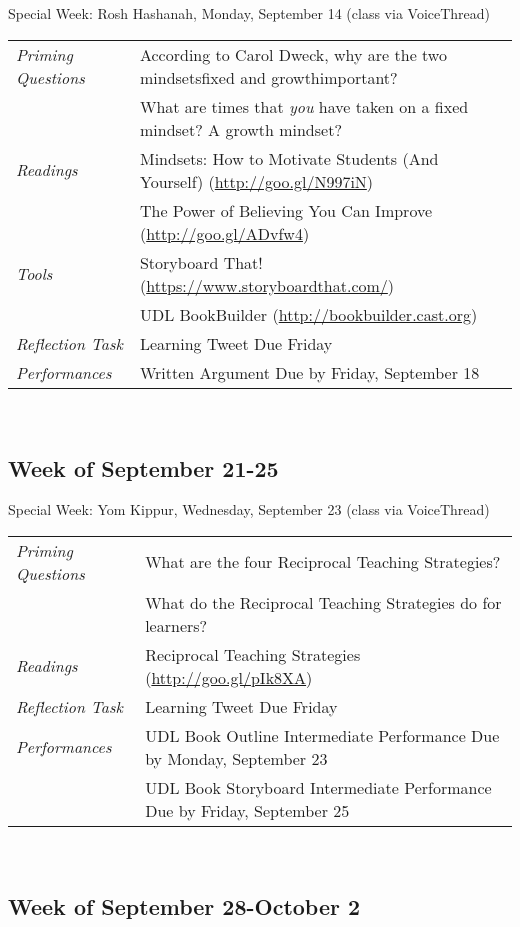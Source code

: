 \documentclass{tufte-handout}
\newcommand{\tabpq}{\faQuestionCircle\medspace\textit{Priming Questions}}
\newcommand{\tabread}{\faBook\medspace\textit{Readings}}
\newcommand{\tabperformance}{\faTasks\medspace\textit{Performances}}
\newcommand{\tabtools}{\faWrench\medspace\textit{Tools}}
\newcommand{\tabtweet}{\faLightbulbO\medspace\textit{Reflection Task} & Learning Tweet Due Friday \\}
\newenvironment{tabsched}
	{\small
	\begin{tabular}{p{1.5in}p{4.5in}}
	\toprule}
	{\bottomrule
	\end{tabular}
	\normalsize\\}
\newenvironment{specweek}
	{\begin{center}
		\fontseries{b} \faBullhorn \medspace Special Week: }
		{\medspace \faBullhorn \fontseries{m}
	\end{center}}
\newcommand{\weeksix}{September 21-25}
\newcommand{\weekseven}{September 28-October 2}
\newcommand{\roshhashanah}{Rosh Hashanah, Monday, September 14 (class via VoiceThread)}
\newcommand{\yomkippur}{Yom Kippur, Wednesday, September 23 (class via VoiceThread)}
\begin{document}
\begin{fullwidth}
\begin{specweek}\roshhashanah\end{specweek}

\begin{tabsched}
	\tabpq & According to Carol Dweck, why are the two mindsets\textemdash{}fixed and growth\textemdash{}important? \\
	& What are times that \emph{you} have taken on a fixed mindset? A growth mindset? \\
	\midrule
	\tabread & Mindsets: How to Motivate Students (And Yourself) (\url{http://goo.gl/N997iN}) \\
	& The Power of Believing You Can Improve (\url{http://goo.gl/ADvfw4}) \\
	\midrule
	\tabtools & Storyboard That! (\url{https://www.storyboardthat.com/}) \\
	& UDL BookBuilder (\url{http://bookbuilder.cast.org}) \\
	\midrule
	\tabtweet
	\midrule
	\tabperformance & Written Argument Due by Friday, September 18 \\
\end{tabsched}

\subsection{Week of \weeksix}

\begin{specweek}\yomkippur\end{specweek}

\begin{tabsched}
	\tabpq & What are the four Reciprocal Teaching Strategies? \\
	& What do the Reciprocal Teaching Strategies do for learners? \\
	\midrule
	\tabread & Reciprocal Teaching Strategies (\url{http://goo.gl/pIk8XA}) \\
	\midrule
	\tabtweet
	\midrule
	\tabperformance & UDL Book Outline Intermediate Performance Due by Monday, September 23 \\
	& UDL Book Storyboard Intermediate Performance Due by Friday, September 25 \\

\end{tabsched}

\subsection{Week of \weekseven}


\end{fullwidth}
\end{document}
